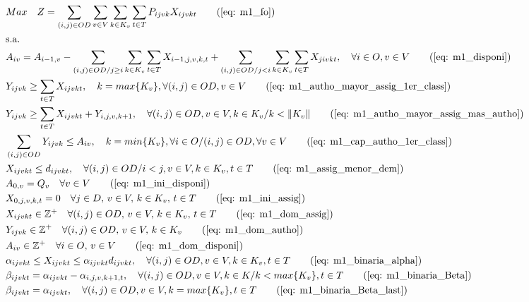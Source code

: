 \begin{align}
	& Max \quad Z = \sum_{(i,j)\in OD} \sum_{v\in V} \sum_{k\in K_v} \sum_{t\in T} P_{ijvk} X_{ijvkt}     \tag{\ref{eq: m1_fo}}   \\
	& \text{s.a.}  \notag \\
	& A_{iv} = A_{i-1,v} - \sum_{(i,j) \in OD/j \geq i} \sum_{k\in K_v}\sum_{t\in T}X_{i-1,j,v,k,t} + \sum_{(i,j) \in OD/j<i} \sum_{k\in K_v}\sum_{t\in T}X_{jivkt}, \quad \forall i \in O, v \in V   \tag{\ref{eq: m1_disponi}} \\
	& Y_{ijvk} \geq  \sum_{t \in T} X_{ijvkt},  \quad k = max\{K_v\}, \forall(i,j) \in OD ,v \in V     \tag{\ref{eq: m1_autho_mayor_assig_1er_class}} \\
	& Y_{ijvk} \geq  \sum_{t \in T} X_{ijvkt} + Y_{i,j,v,k + 1} , \quad \forall(i,j) \in OD, v \in V, k \in K_v / k < \lVert K_v \rVert   \tag{\ref{eq: m1_autho_mayor_assig_mas_autho}} \\
	& \sum_{(i,j) \in OD} Y_{ijvk} \leq A_{iv}, \quad  k = min\{K_v\}, \forall i \in O / (i,j) \in OD,   \forall v \in V       \tag{\ref{eq: m1_cap_autho_1er_class}} \\
	& X_{ijvkt} \leq d_{ijvkt},  \quad \forall (i,j) \in OD / i < j  ,v \in V, k \in K_v, t\in T   \tag{\ref{eq: m1_assig_menor_dem}} \\
	& A_{0,v} = Q_v \quad \forall v \in V  \tag{\ref{eq: m1_ini_disponi}} \\ 
	& X_{0,j,v,k,t} = 0 \quad \forall j \in D,\, v \in V,\, k \in K_v,\, t \in T  \tag{\ref{eq: m1_ini_assig}} \\ 
	& X_{ijvkt} \in \mathbb{Z}^+ \quad \forall(i,j) \in OD,\, v \in V,\, k \in K_v,\, t \in T  \tag{\ref{eq: m1_dom_assig}} \\ 
	& Y_{ijvk} \in \mathbb{Z}^+ \quad \forall(i,j) \in OD,\, v \in V,\, k \in K_v  \tag{\ref{eq: m1_dom_autho}} \\ 
	& A_{iv} \in \mathbb{Z}^+ \quad \forall i \in O,\, v \in V  \tag{\ref{eq: m1_dom_disponi}} \\
	& \alpha_{ijvkt} \leq X_{ijvkt} \leq \alpha_{ijvkt}d_{ijvkt}, \quad   \forall(i,j) \in OD, v \in V, k \in K_v, t \in T   \tag{\ref{eq: m1_binaria_alpha}} \\
	& \beta_{ijvkt} = \alpha_{ijvkt} - \alpha_{i,j,v,k+1,t}, \quad \forall (i,j) \in OD, v \in V, k \in K /k < max\{K_v\}, t\in T    \tag{\ref{eq: m1_binaria_Beta}}   \\
	& \beta_{ijvkt} = \alpha_{ijvkt}, \quad   \forall(i,j) \in OD, v \in V, k = max\{K_v\}, t \in T    \tag{\ref{eq: m1_binaria_Beta_last}}   \\

\end{align}
